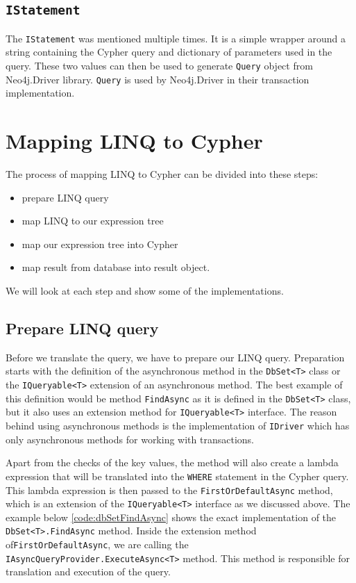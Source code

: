 \subsection{\texttt{IStatement}}

The \texttt{IStatement} was mentioned multiple times. It is a simple wrapper around a string containing the Cypher query and dictionary of parameters
used in the query. These two values can then be used to generate \texttt{Query} object from Neo4j.Driver library. \texttt{Query} is used by
Neo4j.Driver in their transaction implementation.

\section{Mapping LINQ to Cypher}

The process of mapping LINQ to Cypher can be divided into these steps:
\begin{itemize}
    \item {prepare LINQ query}
    \item {map LINQ to our expression tree}
    \item {map our expression tree into Cypher}
    \item {map result from database into result object.}
\end{itemize}
We will look at each step and show some of the implementations.

\subsection{Prepare LINQ query}

Before we translate the query, we have to prepare our LINQ query. Preparation starts with the definition of the asynchronous method in the \texttt{DbSet<T>} class
or the \texttt{IQueryable<T>} extension of an asynchronous method. The best example of this definition would be method \texttt{FindAsync} as it is defined
in the \texttt{DbSet<T>} class, but it also uses an extension method for \texttt{IQueryable<T>} interface. The reason behind using asynchronous methods is
the implementation of \texttt{IDriver} which has only asynchronous methods for working with transactions.

Apart from the checks of the key values, the method will also create a lambda expression that will be translated into the \texttt{WHERE} statement
in the Cypher query. This lambda expression is then passed to the \texttt{FirstOrDefaultAsync} method, which is an extension of the \texttt{IQueryable<T>} interface
as we discussed above. The example below \ref{code:dbSetFindAsync} shows the exact implementation of the \texttt{DbSet<T>.FindAsync} method.
Inside the extension method of\linebreak\texttt{FirstOrDefaultAsync}, we are calling the \texttt{IAsyncQueryProvider.ExecuteAsync<T>} method. This method
is responsible for translation and execution of the query.

